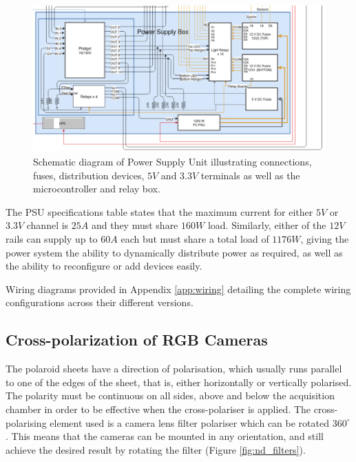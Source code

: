 \documentclass[fleqn,twoside,12pt]{report}
\begin{document}
\begin{figure}[h]
	\centering
	\includegraphics[width=.9\linewidth]{PSU_schem.png}
	\caption{Schematic diagram of Power Supply Unit illustrating connections, fuses, distribution devices, $5V$ and $3.3V$ terminals as well as the microcontroller and relay box.}
	\label{fig:PSU_5}
\end{figure}

The PSU specifications table states that the maximum current for either $5V$ or $3.3V$ channel is $25A$ and they must share $160W$ load. Similarly, either of the $12V$ rails can supply up to $60A$ each but must share a total load of $1176W$, giving the power system the ability to dynamically distribute power as required, as well as the ability to reconfigure or add devices easily.


Wiring diagrams provided in Appendix \ref{app:wiring} detailing the complete wiring configurations across their different versions.



\subsection{Cross-polarization of RGB Cameras}


The polaroid sheets have a direction of polarisation, which usually runs parallel to one of the edges of the sheet, that is, either horizontally or vertically polarised. The polarity must be continuous on all sides, above and below the acquisition chamber in order to be effective when the cross-polariser is applied. The cross-polarising element used is a camera lens filter polariser which can be rotated $360^{\circ}$. This means that the cameras can be mounted in any orientation, and still achieve the desired result by rotating the filter (Figure \ref{fig:nd_filters}).
\end{document}
